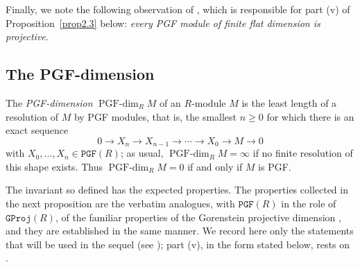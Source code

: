 \documentclass[12pt]{amsart}
\theoremstyle{remark}
\theoremstyle{definition}
\theoremstyle{plain}
\newcommand{\PGFdim}{\operatorname{PGF\text{-}dim}}
\newcommand{\GProj}{\mathtt{GProj}}
\newcommand{\PGF}{\mathtt{PGF}}
\begin{document}
Finally, we note the following observation of \cite[Lemma~2.1]{KS}, which is responsible for part (v) of Proposition~\ref{prop2.3} below: \emph{every PGF module of finite flat dimension is projective}.

\subsection{The PGF-dimension}

The \emph{PGF-dimension} $\PGFdim_RM$ of an $R$-module $M$ is the least length of a resolution of $M$ by PGF modules, that is, the smallest $n\ge0$ for which there is an exact sequence
\[
0\rightarrow X_n\rightarrow X_{n-1}\rightarrow\cdots\rightarrow X_0\rightarrow M\rightarrow0
\]
with $X_0,\dots,X_n\in \PGF(R)$; as usual, $\PGFdim_RM=\infty$ if no finite resolution of this shape exists. Thus $\PGFdim_RM=0$ if and only if $M$ is PGF.

The invariant so defined has the expected properties. The properties collected in the next proposition are the verbatim analogues, with $\PGF(R)$ in the role of $\GProj(R)$, of the familiar properties of the Gorenstein projective dimension \cite{Hol}, and they are established in the same manner. We record here only the statements that will be used in the sequel (see \cite[Propositions~2--5, Theorem~10 and Corollary~13]{DE}); part (v), in the form stated below, rests on \cite[Lemma~2.1]{KS}.
\end{document}
